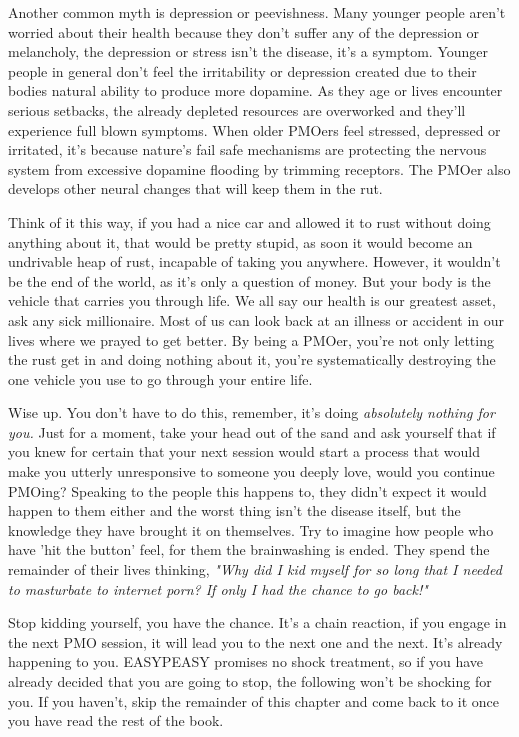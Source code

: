 \documentclass[easypeasy.tex]{subfiles}
\begin{document}
Another common myth is depression or peevishness. Many younger people aren't worried about their health because they don't suffer any of the depression or melancholy, the depression or stress isn't the disease, it's a symptom. Younger people in general don't feel the irritability or depression created due to their bodies natural ability to produce more dopamine. As they age or lives encounter serious setbacks, the already depleted resources are overworked and they'll experience full blown symptoms. When older PMOers feel stressed, depressed or irritated, it's because nature's fail safe mechanisms are protecting the nervous system from excessive dopamine flooding by trimming receptors. The PMOer also develops other neural changes that will keep them in the rut.

Think of it this way, if you had a nice car and allowed it to rust without doing anything about it, that would be pretty stupid, as soon it would become an undrivable heap of rust, incapable of taking you anywhere. However, it wouldn't be the end of the world, as it's only a question of money. But your body is the vehicle that carries you through life. We all say our health is our greatest asset, ask any sick millionaire. Most of us can look back at an illness or accident in our lives where we prayed to get better. By being a PMOer, you're not only letting the rust get in and doing nothing about it, you're systematically destroying the one vehicle you use to go through your entire life.

Wise up. You don't have to do this, remember, it's doing \textit{absolutely nothing for you.} Just for a moment, take your head out of the sand and ask yourself that if you knew for certain that your next session would start a process that would make you utterly unresponsive to someone you deeply love, would you continue PMOing? Speaking to the people this happens to, they didn't expect it would happen to them either and the worst thing isn't the disease itself, but the knowledge they have brought it on themselves. Try to imagine how people who have 'hit the button' feel, for them the brainwashing is ended. They spend the remainder of their lives thinking, \textit{"Why did I kid myself for so long that I needed to masturbate to internet porn? If only I had the chance to go back!"}

Stop kidding yourself, you have the chance. It's a chain reaction, if you engage in the next PMO session, it will lead you to the next one and the next. It's already happening to you. EASYPEASY promises no shock treatment, so if you have already decided that you are going to stop, the following won't be shocking for you. If you haven't, skip the remainder of this chapter and come back to it once you have read the rest of the book.
\end{document}
